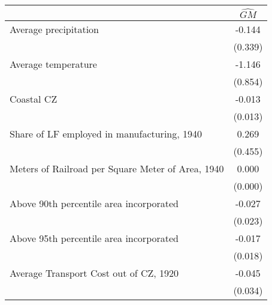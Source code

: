  \begin{tabular}{l*{1}{c}} \toprule
                &\multicolumn{1}{c}{$\widehat{GM}$}\\
\midrule
Average precipitation&   -0.144   \\
                &  (0.339)   \\
\addlinespace
Average temperature&   -1.146   \\
                &  (0.854)   \\
\addlinespace
Coastal CZ      &   -0.013   \\
                &  (0.013)   \\
\addlinespace
Share of LF employed in manufacturing, 1940&    0.269   \\
                &  (0.455)   \\
\addlinespace
Meters of Railroad per Square Meter of Area, 1940&    0.000   \\
                &  (0.000)   \\
\addlinespace
Above 90th percentile area incorporated&   -0.027   \\
                &  (0.023)   \\
\addlinespace
Above 95th percentile area incorporated&   -0.017   \\
                &  (0.018)   \\
\addlinespace
Average Transport Cost out of CZ, 1920&   -0.045   \\
                &  (0.034)   \\
 \bottomrule \end{tabular}
